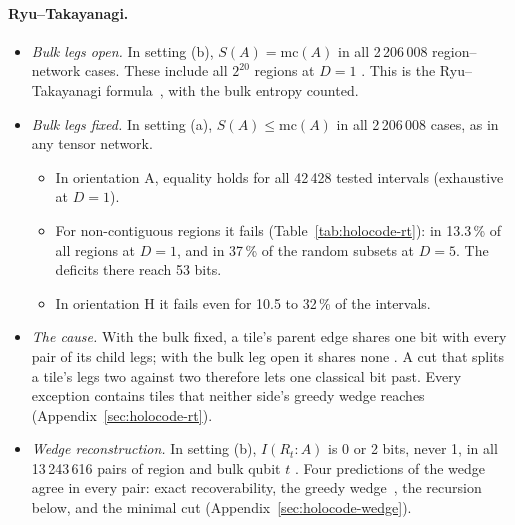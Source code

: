 \paragraph{Ryu--Takayanagi.}
\begin{itemize}[nosep]
\item \emph{Bulk legs open.} In setting (b), $S(A)=\mathrm{mc}(A)$ in all 2\,206\,008 region--network cases. These include all $2^{20}$
  regions at $D=1$ \tagS. This is the Ryu--Takayanagi formula~\cite{rt}, with the bulk entropy counted.
\item \emph{Bulk legs fixed.} In setting (a), $S(A)\le\mathrm{mc}(A)$ in all 2\,206\,008 cases, as in any tensor network.
  \begin{itemize}[nosep]
  \item In orientation A, equality holds for all 42\,428 tested intervals (exhaustive at $D=1$).
  \item For non-contiguous regions it fails (Table~\ref{tab:holocode-rt}): in 13.3\,\% of all regions at $D=1$, and in 37\,\% of the
    random subsets at $D=5$. The deficits there reach 53 bits.
  \item In orientation H it fails even for 10.5 to 32\,\% of the intervals.
  \end{itemize}
\item \emph{The cause.} With the bulk fixed, a tile's parent edge shares one bit with every pair of its child legs; with the bulk leg
  open it shares none . A cut that splits a tile's legs two against two therefore lets one classical bit past. Every
  exception contains tiles that neither side's greedy wedge reaches (Appendix~\ref{sec:holocode-rt}).
\item \emph{Wedge reconstruction.} In setting (b), $I(R_t\!:\!A)$ is 0 or 2 bits, never 1, in all 13\,243\,616 pairs of region and bulk
  qubit $t$ . Four predictions of the wedge agree in every pair: exact recoverability, the greedy wedge~\cite{happy}, the
  recursion below, and the minimal cut (Appendix~\ref{sec:holocode-wedge}).
\end{itemize}

